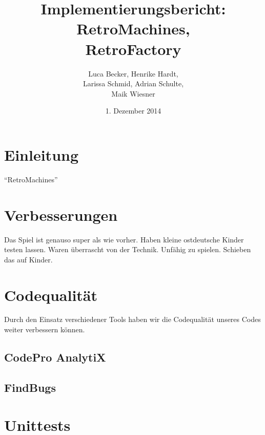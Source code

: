 \documentclass[parskip=full]{scrreprt}
\begin{document}
\title{Implementierungsbericht: RetroMachines, \\ RetroFactory}
\author{Luca Becker, Henrike Hardt,\\Larissa Schmid, Adrian Schulte,\\Maik Wiesner}
\date{1. Dezember 2014}
\maketitle
\thispagestyle{empty}

\clearpage

\thispagestyle{empty}
\tableofcontents
\thispagestyle{empty}

\clearpage
\setcounter{page}{1}

\chapter{Einleitung}

\enquote{RetroMachines}

\chapter{Verbesserungen}

Das Spiel ist genauso super als wie vorher. Haben kleine ostdeutsche Kinder testen lassen. Waren überrascht von der Technik. Unfähig zu spielen. Schieben das auf Kinder.

\chapter{Codequalität}

Durch den Einsatz verschiedener Tools haben wir die Codequalität unseres Codes weiter verbessern können.

\section{CodePro AnalytiX}



\section{FindBugs}



\chapter{Unittests}
\end{document}
